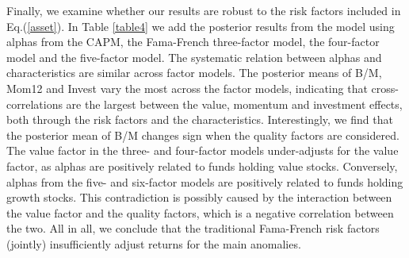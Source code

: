 \par Finally, we examine whether our results are robust to the risk factors included in Eq.(\ref{asset}). In Table \ref{table4} we add the posterior results from the model using alphas from the CAPM, the Fama-French three-factor model, the \citet{carhart1997persistence} four-factor model and the \citet{FAMA20151} five-factor model. The systematic relation between alphas and characteristics are similar across factor models. The posterior means of B/M, Mom12 and Invest vary the most across the factor models, indicating that cross-correlations are the largest between the value, momentum and investment effects, both through the risk factors and the characteristics. Interestingly, we find that the posterior mean of B/M changes sign when the quality factors are considered. The value factor in the three- and four-factor models under-adjusts for the value factor, as alphas are positively related to funds holding value stocks. Conversely, alphas from the five- and six-factor models are positively related to funds holding growth stocks. This contradiction is possibly caused by the interaction between the value factor and the quality factors, which is a negative correlation between the two. All in all, we conclude that the traditional Fama-French risk factors (jointly) insufficiently adjust returns for the main anomalies. 


